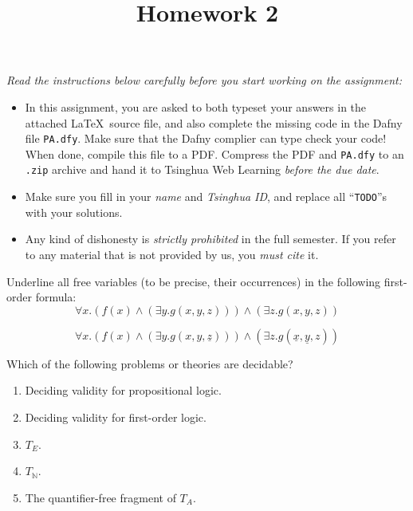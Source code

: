 \documentclass[11pt,a4paper]{article}
\title{Homework 2}
\newcommand{\nat}{\mathbb{N}}
\begin{document}
\maketitle

\textit{Read the instructions below carefully before you start working on the assignment:}
\begin{itemize}
    \item In this assignment, you are asked to both typeset your answers in the attached \LaTeX~source file, and also complete the missing code in the Dafny file \texttt{PA.dfy}.
    Make sure that the Dafny complier can type check your code!
    When done, compile this file to a PDF.
    Compress the PDF and \texttt{PA.dfy} to an \texttt{.zip} archive and hand it to Tsinghua Web Learning \emph{before the due date}.
    \item Make sure you fill in your \emph{name} and \emph{Tsinghua ID},
    and replace all ``\texttt{TODO}''s with your solutions.
    \item Any kind of dishonesty is \emph{strictly prohibited} in the full semester.
    If you refer to any material that is not provided by us, you \emph{must cite} it.
\end{itemize}



\subproblem Underline all free variables (to be precise, their occurrences) in the following first-order formula:
\begin{equation*}
    \forall x. (f(x) \land (\exists y. g(x, y, z))) \land (\exists z. g(x, y, z))
\end{equation*}

\begin{solution}
\begin{equation*}
    \forall x. (f(x) \land (\exists y. g(x, y, \underline{z}))) \land (\exists z. g(\underline{x}, \underline{y}, z))
\end{equation*}
\end{solution}

\subproblem Which of the following problems or theories are decidable?

\begin{enumerate}[label=(\alph*)]
    \item Deciding validity for propositional logic.
    \item Deciding validity for first-order logic.
    \item $T_{E}$.
    \item $T_{\nat}$.
    \item The quantifier-free fragment of $T_A$.
\end{enumerate}
\end{document}
